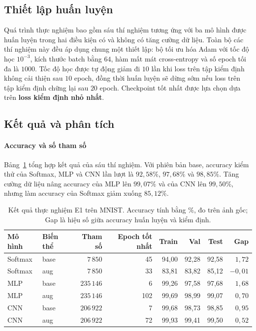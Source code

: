 \documentclass[a4paper,12pt]{article}
\begin{document}
\subsection{Thiết lập huấn luyện}
\label{sec:e1-setup}

Quá trình thực nghiệm bao gồm sáu thí nghiệm tương ứng với ba mô hình được huấn luyện trong hai điều kiện có và không có tăng cường dữ liệu. Toàn bộ các thí nghiệm này đều áp dụng chung một thiết lập: bộ tối ưu hóa Adam với tốc độ học $10^{-3}$, kích thước batch bằng $64$, hàm mất mát cross-entropy và số epoch tối đa là $1000$. Tốc độ học được tự động giảm đi $10$ lần khi loss trên tập kiểm định không cải thiện sau $10$ epoch, đồng thời huấn luyện sẽ dừng sớm nếu loss trên tập kiểm định chững lại sau $20$ epoch. Checkpoint tốt nhất được lựa chọn dựa trên \textbf{loss kiểm định nhỏ nhất}.

\subsection{Kết quả và phân tích}
\label{sec:e1-results}

\paragraph{Accuracy và số tham số} Bảng~\ref{tab:e1-results} tổng hợp kết quả của sáu thí nghiệm. Với phiên bản base, accuracy kiểm thử của Softmax, MLP và CNN lần lượt là $92{,}58\%$, $97{,}68\%$ và $98{,}85\%$. Tăng cường dữ liệu nâng accuracy của MLP lên $99{,}07\%$ và của CNN lên $99{,}50\%$, nhưng làm accuracy của Softmax giảm xuống $85{,}12\%$.

\begin{table}[htbp]
    \centering
    \caption{Kết quả thực nghiệm E1 trên MNIST. Accuracy tính bằng \%, đo trên ảnh gốc; Gap là hiệu số giữa accuracy huấn luyện và kiểm định.}
    \label{tab:e1-results}
    \small
    \begin{tabular}{llrrrrrr}
        \toprule
        Mô hình & Biến thể & Tham số    & Epoch tốt nhất & Train & Val   & Test  & Gap       \\
        \midrule
        Softmax & base     & $7\,850$   & 45             & 94,00 & 92,28 & 92,58 & $1{,}72$  \\
        Softmax & aug      & $7\,850$   & 33             & 83,81 & 83,82 & 85,12 & $-0{,}01$ \\
        MLP     & base     & $235\,146$ & 6              & 99,26 & 97,58 & 97,68 & $1{,}68$  \\
        MLP     & aug      & $235\,146$ & 102            & 99,69 & 98,99 & 99,07 & $0{,}70$  \\
        CNN     & base     & $206\,922$ & 7              & 99,68 & 98,73 & 98,85 & $0{,}95$  \\
        CNN     & aug      & $206\,922$ & 72             & 99,93 & 99,41 & 99,50 & $0{,}52$  \\
        \bottomrule
    \end{tabular}
\end{table}
\end{document}
